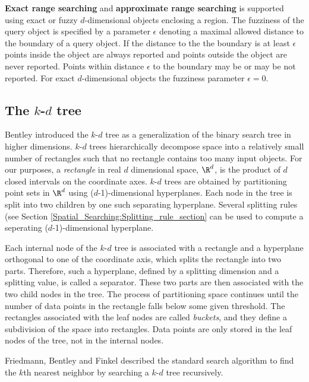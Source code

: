 {\bf Exact range searching}
and 
{\bf approximate range searching} is supported using exact or fuzzy $d$-dimensional objects enclosing a region.
The fuzziness of the query object 
is specified by a parameter $\epsilon$ denoting
a maximal allowed distance to the boundary of a query object.  
If the distance to the the boundary is at
least $\epsilon$
points inside the object
are always reported and 
points outside the object are never reported. Points within distance $\epsilon$ to the 
boundary may be or may be not reported.  For exact $d$-dimensional objects 
the fuzziness parameter $\epsilon=0$.

\subsection{The $k$-$d$ tree}
\label{Kd_tree_section}

Bentley \cite{b-mbstu-75} introduced the $k$-$d$ tree as a generalization of the binary
search tree in higher dimensions. $k$-$d$ trees hierarchically decompose space into a
relatively small number of rectangles such that no rectangle contains too many input objects.
For our purposes, a {\it rectangle} in real $d$ dimensional space, $\R^d$, is the product of $d$ closed
intervals on the coordinate axes.
$k$-$d$ trees are obtained by partitioning point sets in $\R^d$ using
($d$-1)-dimensional hyperplanes.
Each node in the tree is split into two children by one such separating hyperplane.
Several splitting rules (see Section \ref{Spatial_Searching:Splitting_rule_section}
can be used to compute a seperating ($d$-1)-dimensional hyperplane.

Each internal node of the $k$-$d$ tree is associated with a rectangle
and a hyperplane orthogonal to
one of the coordinate axis, which splits the rectangle into two parts.
Therefore, such a hyperplane, defined by a splitting dimension
and a splitting value, is called a separator.
These two parts are then associated
with the two child nodes in the tree. The process of partitioning space continues until the number of data
points in the rectangle falls below some given threshold. The rectangles associated with the leaf nodes
are called {\it buckets}, and they define a subdivision of the space into rectangles.
Data points are only stored in the leaf nodes of the tree, not in the internal nodes.

Friedmann, Bentley and Finkel \cite{fbf-afbml-77} described the standard
search algorithm to find the $k$th nearest neighbor by searching a $k$-$d$ tree recursively.

